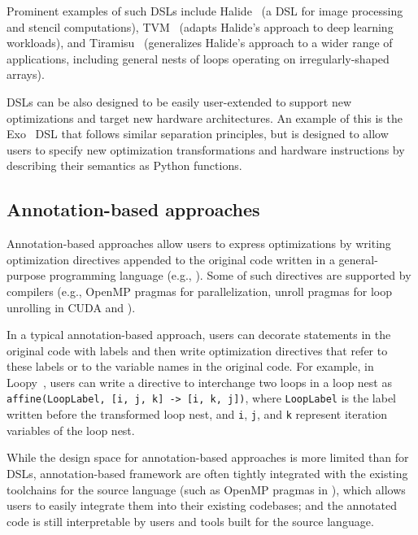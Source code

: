 Prominent examples of such DSLs include Halide~\cite{ragan2013halide} (a DSL for image processing and stencil computations), TVM~\cite{chen2018tvm} (adapts Halide's approach to deep learning workloads), and Tiramisu~\cite{baghdadi2019tiramisu} (generalizes Halide's approach to a wider range of applications, including general nests of loops operating on irregularly-shaped arrays).

DSLs can be also designed to be easily user-extended to support new optimizations and target new hardware architectures. An example of this is the Exo~\cite{ikarashi2022exocompilation} DSL that follows similar separation principles, but is designed to allow users to specify new optimization transformations and hardware instructions by describing their semantics as Python functions.



\subsection{Annotation-based approaches}\label{sec:annotation}


Annotation-based approaches allow users to express optimizations by writing optimization directives appended to the original code written in a general-purpose programming language (e.g., \cpp). Some of such directives are supported by compilers (e.g., OpenMP pragmas for parallelization, unroll pragmas for loop unrolling in CUDA and \cpp).

In a typical annotation-based approach, users can decorate statements in the original code with labels and then write optimization directives that refer to these labels or to the variable names in the original code. For example, in Loopy~\cite{namjoshi2016loopy}, users can write a directive to interchange two loops in a loop nest as \lstinline{affine(LoopLabel, [i, j, k] -> [i, k, j])}, where \lstinline{LoopLabel} is the label written before the transformed loop nest, and \lstinline{i}, \lstinline{j}, and \lstinline{k} represent iteration variables of the loop nest.

While the design space for annotation-based approaches is more limited than for DSLs, annotation-based framework are often tightly integrated with the existing toolchains for the source language (such as OpenMP pragmas in \cpp), which allows users to easily integrate them into their existing codebases; and the annotated code is still interpretable by users and tools built for the source language.


